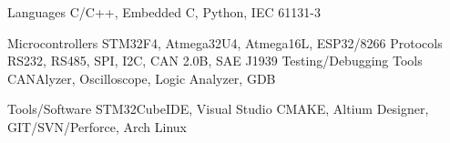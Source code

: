 


\begin{cvskills}


    \cvskill
    {Languages} %
    {C/C++, Embedded C, Python, IEC 61131-3} %

    \cvskill
    {Microcontrollers} %
    {STM32F4, Atmega32U4, Atmega16L, ESP32/8266}
    \cvskill
    {Protocols} %
    {RS232, RS485, SPI, I2C, CAN 2.0B, SAE J1939}
    \cvskill
    {Testing/Debugging Tools} %
    {CANAlyzer, Oscilloscope, Logic Analyzer, GDB}

    \cvskill
    {Tools/Software} %
    {STM32CubeIDE, Visual Studio CMAKE, Altium Designer, GIT/SVN/Perforce, Arch Linux} %


\end{cvskills}